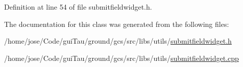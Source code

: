 Definition at line 54 of file submitfieldwidget.\-h.



The documentation for this class was generated from the following files\-:\begin{DoxyCompactItemize}
\item 
/home/jose/\-Code/gui\-Tau/ground/gcs/src/libs/utils/\hyperlink{submitfieldwidget_8h}{submitfieldwidget.\-h}\item 
/home/jose/\-Code/gui\-Tau/ground/gcs/src/libs/utils/\hyperlink{submitfieldwidget_8cpp}{submitfieldwidget.\-cpp}\end{DoxyCompactItemize}
